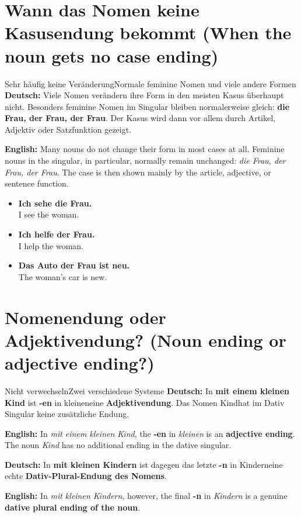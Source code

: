\documentclass[a4paper,11pt]{article}
\newcommand{\GermanText}[1]{\textbf{Deutsch: }#1\par}
\newcommand{\EnglishText}[1]{{\small\color{SoftGray}\textbf{English: }#1\par}}
\newcommand{\ExampleItem}[2]{\item \textbf{#1}\\{\small\color{SoftGray}#2}}
\begin{document}
\section{Wann das Nomen keine Kasusendung bekommt \textnormal{(When the noun gets no case ending)}}
\begin{grammarentry}{Sehr häufig keine Veränderung}{Normale feminine Nomen und viele andere Formen}
\GermanText{Viele Nomen verändern ihre Form in den meisten Kasus überhaupt nicht. Besonders feminine Nomen im Singular bleiben normalerweise gleich: \textbf{die Frau, der Frau, der Frau}. Der Kasus wird dann vor allem durch Artikel, Adjektiv oder Satzfunktion gezeigt.}
\EnglishText{Many nouns do not change their form in most cases at all. Feminine nouns in the singular, in particular, normally remain unchanged: \emph{die Frau, der Frau, der Frau}. The case is then shown mainly by the article, adjective, or sentence function.}
\end{grammarentry}

\begin{exbox}
\begin{itemize}
\ExampleItem{Ich sehe die Frau.}{I see the woman.}
\ExampleItem{Ich helfe der Frau.}{I help the woman.}
\ExampleItem{Das Auto der Frau ist neu.}{The woman's car is new.}
\end{itemize}
\end{exbox}

\section{Nomenendung oder Adjektivendung? \textnormal{(Noun ending or adjective ending?)}}
\begin{grammarentry}{Nicht verwechseln}{Zwei verschiedene Systeme}
\GermanText{In \textbf{mit einem kleinen Kind} ist \textbf{-en} in \glqq kleinen\grqq eine \textbf{Adjektivendung}. Das Nomen \glqq Kind\grqq hat im Dativ Singular keine zusätzliche Endung.}
\EnglishText{In \emph{mit einem kleinen Kind}, the \textbf{-en} in \emph{kleinen} is an \textbf{adjective ending}. The noun \emph{Kind} has no additional ending in the dative singular.}

\GermanText{In \textbf{mit kleinen Kindern} ist dagegen das letzte \textbf{-n} in \glqq Kindern\grqq eine echte \textbf{Dativ-Plural-Endung des Nomens}.}
\EnglishText{In \emph{mit kleinen Kindern}, however, the final \textbf{-n} in \emph{Kindern} is a genuine \textbf{dative plural ending of the noun}.}
\end{grammarentry}
\end{document}
